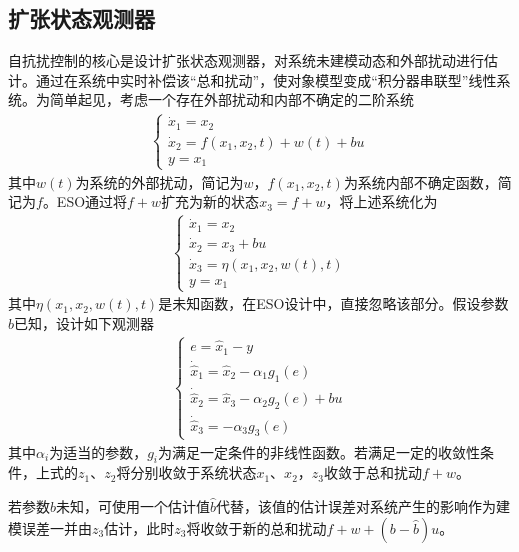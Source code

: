 \subsection{扩张状态观测器}
自抗扰控制的核心是设计扩张状态观测器，对系统未建模动态和外部扰动进行估计。通过在系统中实时补偿该“总和扰动”，使对象模型变成“积分器串联型”线性系统。为简单起见，考虑一个存在外部扰动和内部不确定的二阶系统
\begin{align}
\left\{\begin{array}{l}
\dot{x}_{1}=x_{2} \\
\dot{x}_{2}=f\left(x_{1}, x_{2}, t\right)+w(t)+b u \\
y=x_{1}
\end{array}\right.	\label{eq_sec_sys}
\end{align}
其中$ w(t) $为系统的外部扰动，简记为$ w $，$ f\left(x_{1}, x_{2}, t\right) $为系统内部不确定函数，简记为$ f $。ESO通过将$ f+w $扩充为新的状态$ x_3=f+w $，将上述系统化为
\begin{align}\left\{\begin{array}{l}
\dot{x}_{1}=x_{2} \\
\dot{x}_{2}=x_{3}+b u \\
\dot{x}_{3}=\eta\left(x_{1}, x_{2}, w(t), t\right) \\
y=x_{1}
\end{array}\right.\end{align}
其中$ \eta\left(x_{1}, x_{2}, w(t), t\right) $是未知函数，在ESO设计中，直接忽略该部分。假设参数$ b $已知，设计如下观测器
\begin{align}\left\{\begin{array}{l}
e=\hat{x}_{1}-y \\
\dot{\hat{x}}_{1}=\hat{x}_{2}-\alpha_{1} g_{1}(e) \\
\dot{\hat{x}}_{2}=\hat{x}_{3}-\alpha_{2} g_{2}(e)+b u \\
\dot{\hat{x}}_{3}=-\alpha_{3} g_{3}(e)
\end{array}\right.\end{align}
其中$ \alpha_{i} $为适当的参数，$ g_{i} $为满足一定条件的非线性函数。若满足一定的收敛性条件，上式的$ {z}_{1} $、$ {z}_{2} $将分别收敛于系统状态$ {x}_{1} $、$ {x}_{2} $，$ {z}_{3} $收敛于总和扰动$ f+w $。

若参数$ b $未知，可使用一个估计值$ \hat{b} $代替，该值的估计误差对系统产生的影响作为建模误差一并由$ {z}_{3} $估计，此时$ {z}_{3} $将收敛于新的总和扰动$ f+w+(b-\hat{b})u $。

